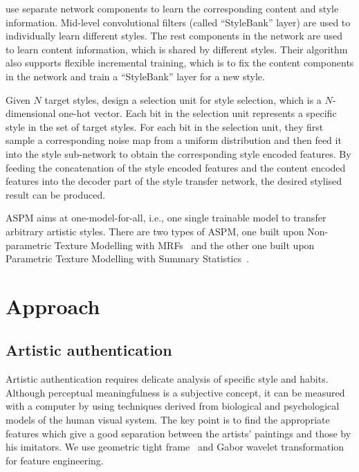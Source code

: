\documentclass{article}
\begin{document}
\citet{Chen_2017_CVPR} use separate network components to learn the corresponding content and style information. 
Mid-level convolutional filters (called ``StyleBank'' layer) are used to individually learn different styles. 
The rest components in the network are used to learn content information, which is shared by different styles. 
Their algorithm also supports flexible incremental training, which is to fix the content components in the network and train a ``StyleBank'' layer for a new style.

Given $N$ target styles, \citet{li2017diversified} design a selection unit for style selection, which is a $N$-dimensional one-hot vector.
Each bit in the selection unit represents a specific style in the set of target styles. For each bit in the selection unit, they first sample a corresponding noise map from a uniform distribution and then feed it into the style sub-network to obtain the corresponding style encoded features. 
By feeding the concatenation of the style encoded features and the content encoded features into the decoder part of the style transfer network, the desired stylised result can be produced.

ASPM aims at one-model-for-all, i.e., one single trainable model to transfer arbitrary artistic styles. 
There are two types of ASPM, one built upon Non-parametric Texture Modelling with MRFs~\citep{Chen_2017_CVPR,gu2018arbitrary} and the other one built upon Parametric Texture Modelling with Summary Statistics~\citep{huang2017arbitrary,ghiasi2017exploring,li2017universal}.

\section{Approach}
\label{approach}


\subsection{Artistic authentication}

Artistic authentication requires delicate analysis of specific style and habits. Although perceptual meaningfulness is a subjective concept, it can be measured with a computer by using techniques derived from biological and psychological models of the human visual system. 
The key point is to find the appropriate features which give a good separation between the artists’ paintings and those by his imitators. 
We use geometric tight frame~\citep{liu2016geometric} and Gabor wavelet transformation~\citep{johnson2008image} for feature engineering.
\end{document}
